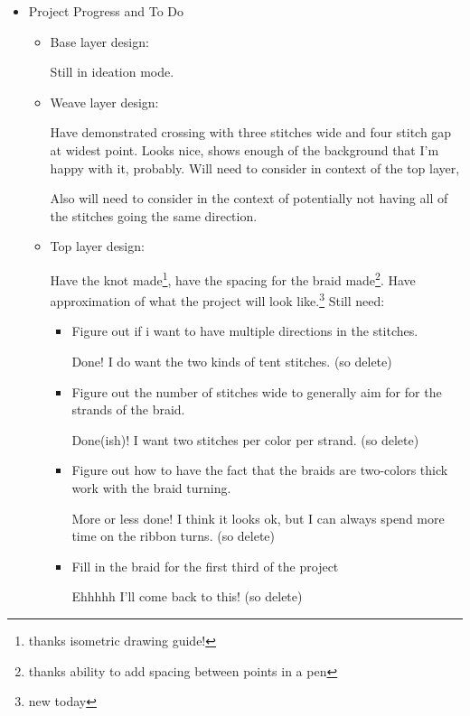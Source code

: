 \documentclass[12pt]{article}
\renewcommand{\,}{\textsuperscript{,}}
\begin{document}
\begin{itemize}
\begin{itemize}
\begin{itemize}
\item Project Progress and To Do %

\begin{itemize}  
 \item Base layer design:  
   
 Still in ideation mode.  
 \item Weave layer design:  
   
Have demonstrated crossing with three stitches wide and four stitch gap at widest point. Looks nice, shows enough of the background that I'm happy with it, probably.  
Will need to consider in context of the top layer,  
   
Also will need to consider in the context of potentially not having all of the stitches going the same direction.

 \item Top layer design:  
   
Have the knot made\footnote{thanks isometric drawing guide!}, have the spacing for the braid made\footnote{thanks ability to add spacing between points in a pen}.   
Have approximation of what the project will look like.\footnote{new today}  
Still need:  
 \begin{itemize}  
 \item Figure out if i want to have multiple directions in the stitches.

Done! I do want the two kinds of tent stitches. (so delete)  
 \item Figure out the number of stitches wide to generally aim for for the strands of the braid.

Done(ish)! I want two stitches per color per strand. (so delete)  
 \item Figure out how to have the fact that the braids are two-colors thick work with the braid turning.

More or less done! I think it looks ok, but I can always spend more time on the ribbon turns. (so delete)  
 \item Fill in the braid for the first third of the project

Ehhhhh I'll come back to this! (so delete)  
 \end{itemize}  


\end{itemize}
\end{itemize}
\end{itemize}
\end{itemize}
\end{document}
